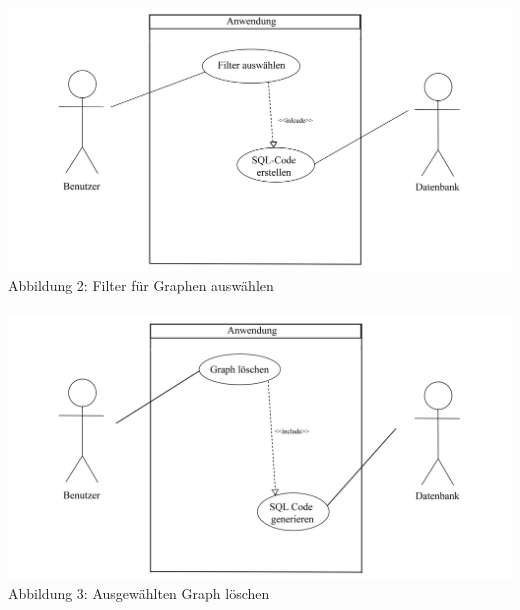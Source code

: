 \documentclass[13pt]{scrreprt}
\begin{document}
\includegraphics[scale=0.75]{Filter_auswaehlen.jpg}
\centering Abbildung 2: Filter für Graphen auswählen
\\
\ \\

\includegraphics[scale=0.75]{Graph_loeschen.jpg}
\centering Abbildung 3: Ausgewählten Graph löschen
\\
\ \\
\end{document}
